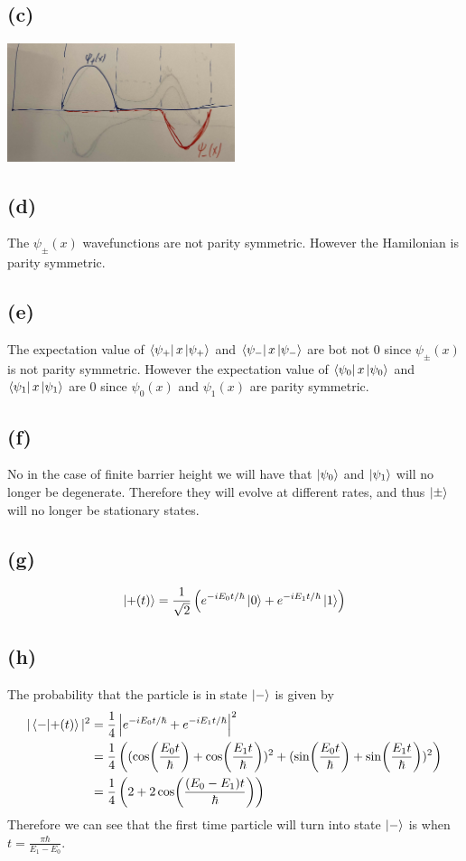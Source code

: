 \documentclass[11pt]{article}
\begin{document}
\subsection*{(c)}
\includegraphics*[width=0.5\textwidth]{prob1c.png}
\subsection*{(d)}
The $\psi_{\pm}(x)$ wavefunctions are not parity symmetric. However the Hamilonian is 
parity symmetric.
\subsection*{(e)}
The expectation value of $\bra{\psi_{+}}x\ket{\psi_{+}}$ and 
$\bra{\psi_{-}}x\ket{\psi_{-}}$ are bot not $0$ since $\psi_{\pm}(x)$ is 
not parity symmetric. However the expectation value of $
\bra{\psi_{0}}x\ket{\psi_{0}}$ and $\bra{\psi_{1}}x\ket{\psi_{1}}$ are $0$ since 
$\psi_{0}(x)$ and $\psi_{1}(x)$ are parity symmetric.
\subsection*{(f)}
No in the case of finite barrier height we will have that $\ket{\psi_0}$ 
and $\ket{\psi_1}$ will no longer be degenerate. Therefore they will evolve at 
different rates, and thus $\ket{\pm}$ will no longer be stationary states.
\subsection*{(g)}
$$\ket{+(t)} = \frac{1}{\sqrt{2}}\left(
    e^{-iE_0t/\hbar}\ket{0} + e^{-iE_1t/\hbar}\ket{1}
\right)$$
\subsection*{(h)}
The probability that the particle is in state $\ket{-}$ is given by 
\begin{align*}
    |\bra{-}\ket{+(t)}|^2 &= \frac{1}{4}\left|
        e^{-iE_0t/\hbar} + e^{-iE_1t/\hbar}\right|^2\\
        &= \frac{1}{4}\left(
            (\cos(\frac{E_0t}{\hbar}) + \cos(\frac{E_1t}{\hbar}))^2 + 
            (\sin(\frac{E_0t}{\hbar}) + \sin(\frac{E_1t}{\hbar}))^2
        \right)\\
        &= \frac{1}{4}\left(
            2 + 2\cos(\frac{(E_0 - E_1)t}{\hbar})\right)
\end{align*}
Therefore we can see that the first time particle will turn 
into state $\ket{-}$ is when $t = \frac{\pi\hbar}{E_1 - E_0}$.
\end{document}
